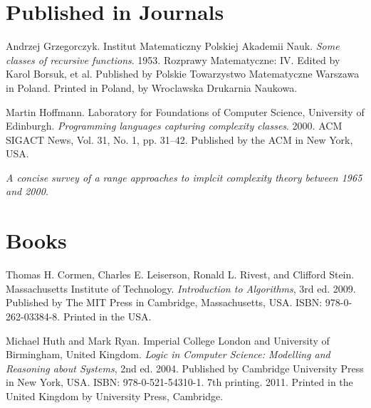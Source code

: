 \begin{thebibliography}{9} %

\section*{Published in Journals}


Andrzej Grzegorczyk. Institut Matematiczny Polskiej Akademii Nauk. \emph{Some
classes of recursive functions}. 1953. Rozprawy Matematyczne: IV. Edited by
Karol Borsuk, et al. Published by Polskie Towarzystwo Matematyczne Warszawa in
Poland. Printed in Poland, by Wroclawska Drukarnia Naukowa.

\backrefprint


Martin Hoffmann. Laboratory for Foundations of Computer Science, University of
Edinburgh. \emph{Programming languages capturing complexity classes}. 2000. ACM
SIGACT News, Vol. 31, No. 1, pp. 31--42. Published by the ACM in New York, USA.

\emph{A concise survey of a range approaches to implcit complexity theory
between 1965 and 2000.}

\backrefprint

\section*{Books}


Thomas H. Cormen, Charles E. Leiserson, Ronald L. Rivest, and Clifford Stein.
Massachusetts Institute of Technology.  \emph{Introduction to Algorithms}, 3rd
ed. 2009. Published by The MIT Press in Cambridge, Massachusetts, USA. ISBN:
978-0-262-03384-8. Printed in the USA.

\backrefprint


Michael Huth and Mark Ryan. Imperial College London and University of
Birmingham, United Kingdom. \emph{Logic in Computer Science: Modelling and
Reasoning about Systems}, 2nd ed. 2004. Published by Cambridge University Press
in New York, USA. ISBN: 978-0-521-54310-1. 7th printing. 2011. Printed in the
United Kingdom by University Press, Cambridge.

\backrefprint


\end{thebibliography}
